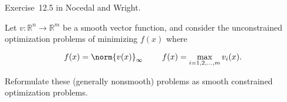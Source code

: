 \begin{problem}\label{prob:02}%
  Exercise~12.5 in Nocedal and Wright.
  
  Let $v:\mathbb{R}^n \rightarrow \mathbb{R}^m$ be a smooth vector function, and consider the unconstrained optimization problems of minimizing $f(x)$ where
  
  \[f(x)=\norm{v(x)}_{\infty}~~~~~~~f(x)=\max_{i=1,2,\ldots,m}v_i(x)\text{.}\]
  
  \noindent
  Reformulate these (generally nonsmooth) problems as smooth constrained optimization problems.
\end{problem}


